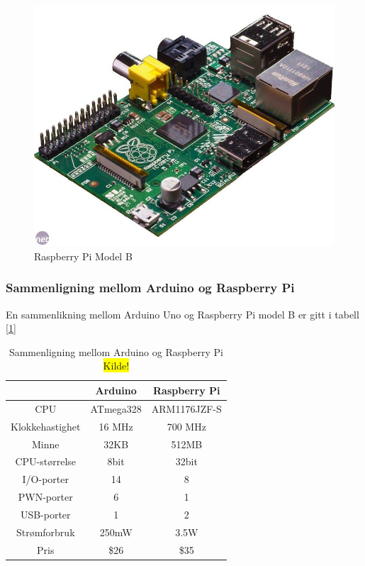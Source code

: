 \begin{figure}[h!]
\centering
\includegraphics[scale = 0.25]{img/pi.jpg}
\caption{Raspberry Pi Model B \cite{Raspberry}}
\label{fig:Raspberryfigur}
\end{figure}  

\subsubsection{Sammenligning mellom Arduino og Raspberry Pi}
En sammenlikning mellom Arduino Uno og Raspberry Pi model B er gitt i tabell [\ref{tab:ArdRas}]

\begin{table}[h!]
\caption{Sammenligning mellom Arduino og Raspberry Pi \cite{ArduinoSpec,RpiSpec} \colorbox{yellow}{Kilde!}}
\centering
\begin{tabular}{ |c |c |c| }
	\hline
   & Arduino & Raspberry Pi \\
	\hline
  	CPU & 	ATmega328 & ARM1176JZF-S \\
  	Klokkehastighet & 16 MHz & 700 MHz \\
	Minne & 32KB & 512MB\\ 
	CPU-størrelse & 8bit & 32bit\\
	I/O-porter & 14 & 8 \\
	PWN-porter & 6 & 1 \\
	USB-porter & 1 & 2 \\
	Strømforbruk & 250mW & 3.5W\\
	Pris & \$26 & \$35 \\
	\hline  
\end{tabular}
	\label{tab:ArdRas}
\end{table}

